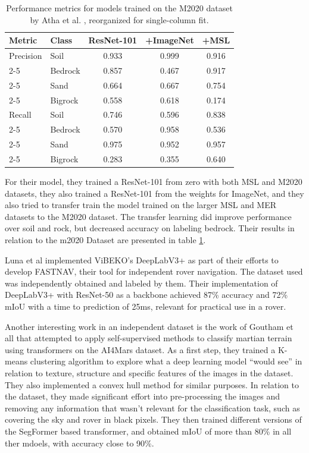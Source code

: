\documentclass[10pt, conference]{IEEEtran}
\begin{document}
\begin{table}[h]
  \centering
  \begin{tabular}{|l|l|c|c|c|}
    \hline
    \textbf{Metric} & \textbf{Class} & \textbf{ResNet-101} & \textbf{+ImageNet} & \textbf{+MSL} \\ \hline
    \hline
    Precision & Soil    & 0.933 & 0.999 & 0.916 \\ \cline{2-5}
                    & Bedrock & 0.857 & 0.467 & 0.917 \\ \cline{2-5}
                    & Sand    & 0.664 & 0.667 & 0.754 \\ \cline{2-5}
                    & Bigrock & 0.558 & 0.618 & 0.174 \\ \hline
    \hline
    Recall    & Soil    & 0.746 & 0.596 & 0.838 \\ \cline{2-5}
                    & Bedrock & 0.570 & 0.958 & 0.536 \\ \cline{2-5}
                    & Sand    & 0.975 & 0.952 & 0.957 \\ \cline{2-5}
                    & Bigrock & 0.283 & 0.355 & 0.640 \\ \hline
  \end{tabular}
  \caption{Performance metrics for models trained on the M2020 dataset by Atha et al. \cite{Atha2022}, reorganized for single-column fit.}
  \label{tab:m2020_atha}
\end{table}

For their model, they trained a ResNet-101 from zero with both MSL and M2020 datasets, they also
trained a ResNet-101 from the weights for ImageNet, and they also tried to transfer train the model
trained on the larger MSL and MER datasets to the M2020 dataset. The transfer learning did improve
performance over soil and rock, but decreased accuracy on labeling bedrock. Their results in
relation to the m2020 Dataset are presented in table \ref{tab:m2020_atha}.

Luna et al \cite{Luna2025} implemented ViBEKO's DeepLabV3+ as part
of their efforts to develop FASTNAV, their tool for independent rover navigation. The dataset used
was independently obtained and labeled by them. Their implementation of DeepLabV3+ with ResNet-50
as a backbone achieved 87\% accuracy and 72\% mIoU with a time to prediction of 25ms, relevant
for practical use in a rover.

Another interesting work in an independent dataset is the work of Goutham et all \cite{Goutham2022}
that attempted to apply self-supervised methods to classify martian terrain using transformers on
the AI4Mars dataset. As a first step, they trained a K-means clustering algorithm to explore what
a deep learning model ``would see'' in relation to texture, structure and specific features of the images
in the dataset. They also implemented a convex hull method for similar purposes. In relation to the dataset,
they made significant effort into pre-processing the images and removing any information that wasn't
relevant for the classification task, such as covering the sky and rover in black pixels.
They then trained different versions of the SegFormer based transformer, and obtained mIoU of more than
80\% in all ther mdoels, with accuracy close to 90\%.
\end{document}
